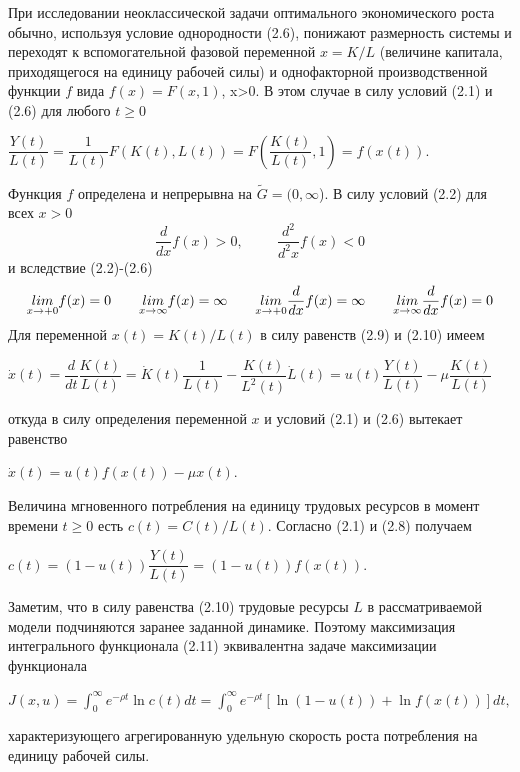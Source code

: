 При исследовании неоклассической задачи оптимального экономического роста обычно, используя условие однородности (2.6), понижают размерность системы и переходят к вспомогательной фазовой переменной $ x = K/L $ (величине капитала, приходящегося на единицу рабочей силы) и однофакторной производственной функции $ f $ вида $ f(x)=F(x,1) $, x>0. В этом случае в силу условий (2.1) и (2.6) для любого $ t \ge 0 $ 
\begin{center}
	$ \dfrac{Y(t)}{L(t)}=
	\dfrac{1}{L(t)}F(K(t),L(t)) = F \left(\dfrac{K(t)}{L(t)},1\right) = f(x(t)).
	$
\end{center} 
Функция $ f $ определена и непрерывна на $\tilde{G} = (0 ,\infty$). В силу условий (2.2) для всех $ x>0  $
\begin{equation}
\frac{d}{dx}f(x) > 0, \hspace{1cm} \frac{d^2}{d^2x}f(x) < 0 
\end{equation}
и вследствие (2.2)-(2.6)
\begin{equation}
\underset{x \rightarrow +0}{lim} f(x) = 0 \hspace{0.7cm} \underset{x \rightarrow \infty}{lim} f(x) = \infty \hspace{0.7cm} \underset{x \rightarrow +0}{lim} \frac{d}{dx} f(x) = \infty \hspace{0.7cm} \underset{x \rightarrow \infty}{lim} \frac{d}{dx} f(x) = 0
\end{equation}
Для переменной $ x(t)=K(t)/L(t) $ в силу равенств (2.9) и (2.10) имеем
\begin{center}
	$ \dot{x}(t)=\dfrac{d}{dt}\dfrac{K(t)}{L(t)} = \dot{K}(t)\dfrac{1}{L(t)} - \dfrac{K(t)}{L^2(t)}\dot{L}(t) = u(t)\dfrac{Y(t)}{L(t)} - \mu \dfrac{K(t)}{L(t)} $
\end{center}
откуда в силу определения переменной $ x $ и условий (2.1) и (2.6) вытекает равенство
\begin{center}
	$\dot{x}(t)=u(t)f(x(t))-\mu x(t).  $
\end{center}
Величина мгновенного потребления на единицу трудовых ресурсов в момент времени $ t \ge 0 $ есть $ c(t)=C(t)/L(t) $. Согласно (2.1) и (2.8) получаем 
\begin{center}
	$ c(t) = (1-u(t))\dfrac{Y(t)}{L(t)} = (1-u(t))f(x(t)).  $
\end{center}

Заметим, что в силу равенства (2.10) трудовые ресурсы $ L $ в рассматриваемой модели подчиняются заранее заданной динамике. Поэтому максимизация интегрального функционала (2.11) эквивалентна задаче максимизации функционала
\begin{center}
	$ J(x,u)= \int_{0}^{\infty}
	e^{-\rho t} \ln c(t)dt =
	\int_{0}^{\infty}
	e^{-\rho t}[\ln(1-u(t))+\ln f(x(t))]dt,  $
\end{center}
характеризующего агрегированную удельную скорость роста потребления на единицу рабочей силы.

